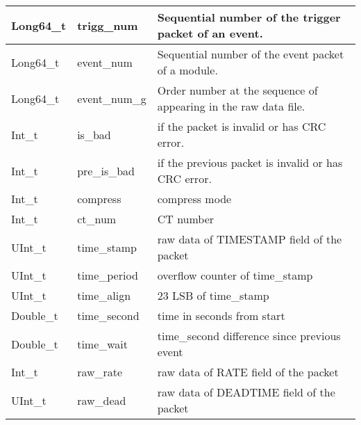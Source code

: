 \documentclass[a4paper, 12pt, onecolumn]{article}
\begin{document}
\begin{center}
  \label{tab:t-modules}    
  \tablelasttail{\hline}
  \begin{supertabular}{| p{28mm} | p{25mm} | p{70mm} |}
    Long64\_t          & trigg\_num          & Sequential number of the trigger packet of an event. \\\hline
    Long64\_t          & event\_num          & Sequential number of the event packet of a module. \\\hline
    Long64\_t          & event\_num\_g       & Order number at the sequence of appearing in the raw data file. \\\hline
    Int\_t             & is\_bad             & if the packet is invalid or has CRC error. \\\hline
    Int\_t             & pre\_is\_bad        & if the previous packet is invalid or has CRC error. \\\hline
    Int\_t             & compress            & compress mode \\\hline
    Int\_t             & ct\_num             & CT number \\\hline
    UInt\_t            & time\_stamp         & raw data of TIMESTAMP field of the packet \\\hline
    UInt\_t            & time\_period        & overflow counter of time\_stamp \\\hline
    UInt\_t            & time\_align         & 23 LSB of time\_stamp  \\\hline
    Double\_t          & time\_second        & time in seconds from start  \\\hline
    Double\_t          & time\_wait          & time\_second difference since previous event \\\hline
    Int\_t             & raw\_rate           & raw data of RATE field of the packet \\\hline
    UInt\_t            & raw\_dead           & raw data of DEADTIME field of the packet \\\hline

\end{supertabular}
\end{center}
\end{document}
